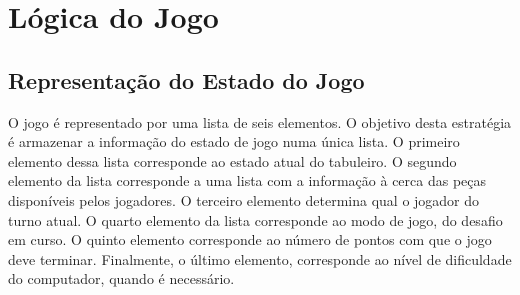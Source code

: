 \documentclass[a4paper]{article}
\begin{document}
\newpage





\section{Lógica do Jogo\newline}


\subsection{Representação do Estado do Jogo\newline}

O jogo é representado por uma lista de seis elementos. O objetivo desta estratégia é armazenar a informação do estado de jogo numa única lista. O primeiro elemento dessa lista corresponde ao estado atual do tabuleiro. O segundo elemento da lista corresponde a uma lista com a informação à cerca das peças disponíveis pelos jogadores. O terceiro elemento determina qual o jogador do turno atual. O quarto elemento da lista corresponde ao modo de jogo, do desafio em curso. O quinto elemento corresponde ao número de pontos com que o jogo deve terminar. Finalmente, o último elemento, corresponde ao nível de dificuldade do computador, quando é necessário. 
\end{document}
